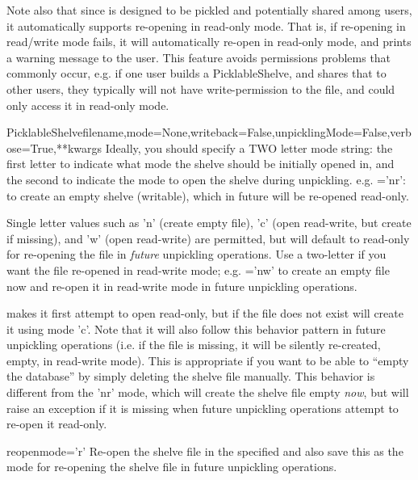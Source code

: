 \documentclass{howto}
\begin{document}
Note also that since  is designed to be pickled
and potentially shared among users, it automatically supports re-opening in
read-only mode.  That is, if re-opening in read/write mode fails, it will 
automatically re-open in read-only mode, and prints a warning message to the
user.  This feature avoids permissions problems that commonly occur, e.g.
if one user builds a PicklableShelve, and shares that to other users, they 
typically will not have write-permission to the file, and could only access
it in read-only mode.
\begin{funcdesc}{PicklableShelve}{filename,mode=None,writeback=False,unpicklingMode=False,verbose=True,**kwargs}
  Ideally, you
  should specify a TWO letter mode string: the first letter to
  indicate what mode the shelve should be initially opened in, and
  the second to indicate the mode to open the shelve during unpickling.
  e.g. ='nr': to create an empty shelve (writable),
  which in future will be re-opened read-only.

  Single letter  values such as 'n' (create empty file), 'c'
  (open read-write, but create if missing), and 'w' (open read-write)
  are permitted, but will default to read-only for re-opening the file
  in {\em future} unpickling operations.  Use a two-letter 
  if you want the file re-opened in read-write mode; e.g. ='nw'
  to create an empty file now and re-open it in read-write mode in future
  unpickling operations.

   makes it first attempt to open read-only, but if the file
  does not exist will create it using mode 'c'.  Note that it will also 
  follow this behavior pattern in future unpickling operations (i.e. if
  the file is missing, it will be silently re-created, empty, in read-write mode).
  This is appropriate if you want to be able to ``empty the database'' by
  simply deleting the shelve file manually.  This behavior is different from
  the 'nr' mode, which will create the shelve file empty {\em now}, but 
  will raise an exception if it is missing when future unpickling operations
  attempt to re-open it read-only.
\end{funcdesc}

\begin{funcdesc}{reopen}{mode='r'}
  Re-open the shelve file in the specified  and also save this
   as the mode for re-opening the shelve file in future unpickling
  operations.
\end{funcdesc}
\end{document}
